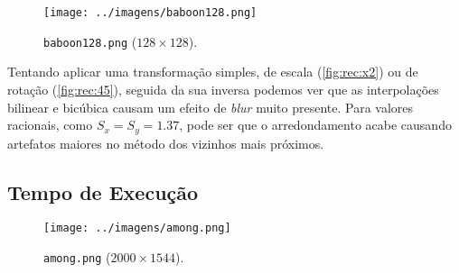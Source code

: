     \begin{figure}[H]
        \centering
        \texttt{[image: ../imagens/baboon128.png]}
        \caption{\texttt{baboon128.png} ($128 \times 128$).}
        \label{fig:baboon128}
    \end{figure}

    Tentando aplicar uma transformação simples, de escala (\cref{fig:rec:x2}) ou de rotação (\cref{fig:rec:45}), seguida da sua inversa podemos ver que as interpolações bilinear e bicúbica causam um efeito de \textit{blur} muito presente. Para valores racionais, como $S_x = S_y = 1.37$, pode ser que o arredondamento acabe causando artefatos maiores no método dos vizinhos mais próximos.

    

    

\subsection{Tempo de Execução}

    \begin{figure}[H]
        \centering
        \texttt{[image: ../imagens/among.png]}
        \caption{\texttt{among.png} ($2000 \times 1544$).}
        \label{fig:among}
    \end{figure}
